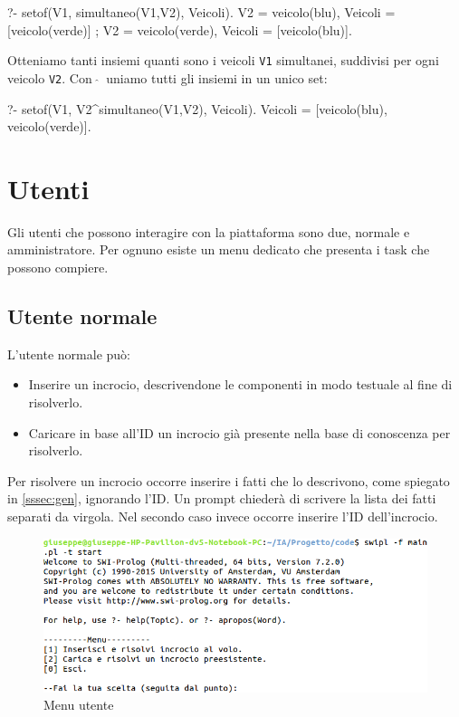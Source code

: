 \begin{verbatimtab}
?- setof(V1, simultaneo(V1,V2), Veicoli).
V2 = veicolo(blu),
Veicoli = [veicolo(verde)] ;
V2 = veicolo(verde),
Veicoli = [veicolo(blu)].
\end{verbatimtab}

Otteniamo tanti insiemi quanti sono i veicoli \texttt{V1} simultanei, suddivisi per ogni veicolo \texttt{V2}. Con $\ \widehat{}\ $ uniamo tutti gli insiemi in un unico set:

\begin{verbatimtab}
?- setof(V1, V2^simultaneo(V1,V2), Veicoli).
Veicoli = [veicolo(blu), veicolo(verde)].
\end{verbatimtab}

\section{Utenti}
\label{sec:users}
Gli utenti che possono interagire con la piattaforma sono due, normale e amministratore. Per ognuno esiste un menu dedicato che presenta i task che possono compiere.

\subsection{Utente normale}
L'utente normale può:
\begin{itemize}
	\item Inserire un incrocio, descrivendone le componenti in modo testuale al fine di risolverlo.
	\item Caricare in base all'ID un incrocio già presente nella base di conoscenza per risolverlo.
\end{itemize}

Per risolvere un incrocio occorre inserire i fatti che lo descrivono, come spiegato in \ref{sssec:gen}, ignorando l'ID. Un prompt chiederà di scrivere la lista dei fatti separati da virgola. Nel secondo caso invece occorre inserire l'ID dell'incrocio.

\begin{figure}[!hbtp]
	\includegraphics[width=\textwidth]{images/user}
	\caption{Menu utente}
\end{figure}


